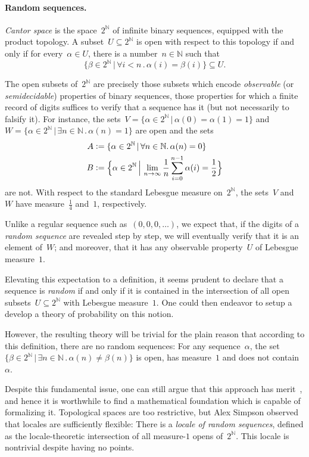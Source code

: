 \documentclass{ws-rv9x6}
\newcommand{\NN}{\mathbb{N}}
\newcommand{\defeq}{\vcentcolon=}
\renewcommand{\_}{\mathpunct{.}}
\newcommand{\?}{\,{:}\,}
\begin{document}
\paragraph{Random sequences.} \emph{Cantor space} is the space~$2^\NN$ of
infinite binary sequences, equipped with the product topology. A subset~$U
\subseteq 2^\NN$ is open with respect to this topology if and only if for
every~$\alpha \in U$, there is a number~$n \in \NN$ such that
\[ \{ \beta \in 2^\NN \,|\, \forall i < n\_ \alpha(i) = \beta(i) \} \subseteq U. \]

The open subsets of~$2^\NN$ are precisely those subsets which encode
\emph{observable} (or \emph{semidecidable}) properties of binary sequences,
those properties for which a finite record of digits suffices to verify that a
sequence has it (but not necessarily to falsify it). For instance, the sets~$V
= \{ \alpha \in 2^\NN \,|\, \alpha(0) = \alpha(1) = 1 \}$ and~$W = \{
\alpha \in 2^\NN \,|\, \exists n\in\NN\_ \alpha(n) = 1 \}$ are open and the sets
\begin{align*}
  A &\defeq \{ \alpha \in 2^\NN \,|\, \forall n\in\NN\_ \alpha(n) = 0 \} \\
  B &\defeq \Bigl\{ \alpha \in 2^\NN \,\Big|\, \lim_{n \to \infty} \frac{1}{n} \sum_{i=0}^{n-1} \alpha(i) = \frac{1}{2} \Bigr\}
\end{align*}
are not. With respect to the standard Lebesgue measure on~$2^\NN$, the sets~$V$
and~$W$ have measure~$\frac{1}{4}$ and~$1$, respectively.

Unlike a regular sequence such as~$(0,0,0,\ldots)$, we expect that, if the
digits of a \emph{random sequence} are revealed step by step, we will
eventually verify that it is an element of~$W$; and moreover, that it has any
observable property~$U$ of Lebesgue measure~$1$.

Elevating this expectation to a definition, it seems prudent to declare that a
sequence is \emph{random} if and only if it is contained in the intersection of
all open subsets~$U \subseteq 2^\NN$ with Lebesgue measure~$1$. One could then
endeavor to setup a develop a theory of probability on this notion.

However, the resulting theory will be trivial for the plain reason that
according to this definition, there are no random sequences: For any
sequence~$\alpha$, the set~$\{ \beta \in 2^\NN \,|\, \exists n \in \NN\_
\alpha(n) \neq \beta(n) \}$ is open, has measure~$1$ and does not
contain~$\alpha$.

Despite this fundamental issue, one can still argue that this approach has
merit~\cite{simpson:randomness}, and hence it is worthwhile to find a
mathematical foundation which is capable of formalizing it. Topological
spaces are too restrictive, but Alex Simpson observed that locales are
sufficiently flexible: There is a \emph{locale of random sequences}, defined as
the locale-theoretic intersection of all measure-$1$ opens of~$2^\NN$. This
locale is nontrivial despite having no points.
\end{document}
